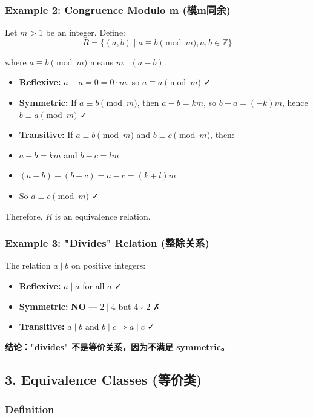 \documentclass[10pt,a4paper,openany]{ctexbook}
\theoremstyle{definition}
\theoremstyle{remark}
\begin{document}
\subsubsection{Example 2: Congruence Modulo m (模m同余)}

Let $m > 1$ be an integer. Define:
\[
R = \{(a,b) \mid a \equiv b \pmod{m}, a,b \in \mathbb{Z}\}
\]

where $a \equiv b \pmod{m}$ means $m \mid (a - b)$.
\begin{itemize}
\item \textbf{Reflexive:} $a - a = 0 = 0 \cdot m$, so $a \equiv a \pmod{m}$ ✓
\item \textbf{Symmetric:} If $a \equiv b \pmod{m}$, then $a - b = km$, so $b - a = (-k)m$, hence $b \equiv a \pmod{m}$ ✓
\item \textbf{Transitive:} If $a \equiv b \pmod{m}$ and $b \equiv c \pmod{m}$, then:
\item $a - b = km$ and $b - c = lm$
\item $(a - b) + (b - c) = a - c = (k + l)m$
\item So $a \equiv c \pmod{m}$ ✓

\end{itemize}

Therefore, $R$ is an equivalence relation.
\subsubsection{Example 3: "Divides" Relation (整除关系)}

The relation $a \mid b$ on positive integers:
\begin{itemize}
\item \textbf{Reflexive:} $a \mid a$ for all $a$ ✓
\item \textbf{Symmetric:} \textbf{NO} — $2 \mid 4$ but $4 \nmid 2$ ✗
\item \textbf{Transitive:} $a \mid b$ and $b \mid c \Rightarrow a \mid c$ ✓

\end{itemize}

\textbf{结论："divides" 不是等价关系，因为不满足 symmetric。}
\vspace{-2pt}

\subsection{3. Equivalence Classes (等价类)}

\subsubsection{Definition}
\end{document}
